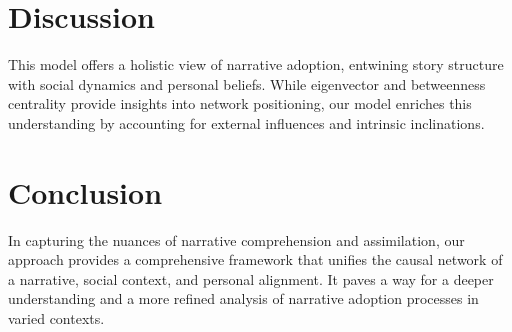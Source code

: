 \documentclass[sn-mathphys,Numbered]{sn-jnl}%
\theoremstyle{thmstyleone}%
\theoremstyle{thmstyletwo}%
\theoremstyle{thmstylethree}%
\begin{document}
\section{Discussion}
This model offers a holistic view of narrative adoption, entwining story structure with social dynamics and personal beliefs. While eigenvector and betweenness centrality provide insights into network positioning, our model enriches this understanding by accounting for external influences and intrinsic inclinations.

\section{Conclusion}
In capturing the nuances of narrative comprehension and assimilation, our approach provides a comprehensive framework that unifies the causal network of a narrative, social context, and personal alignment. It paves a way for a deeper understanding and a more refined analysis of narrative adoption processes in varied contexts.
\end{document}

